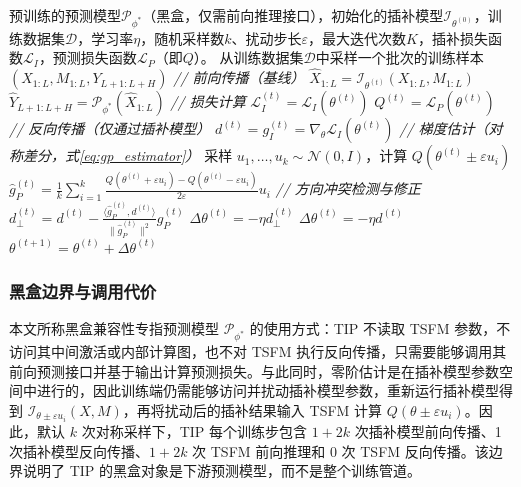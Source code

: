 \documentclass{article}
\begin{document}
\begin{algorithm}[ht]
	\caption{基于零阶梯度估计的任务感知插补方法}
	\label{alg:tip}
	\begin{algorithmic}[1]
		\Require 预训练的预测模型$\mathcal{P}_{\phi^\ast}$（黑盒，仅需前向推理接口），初始化的插补模型$\mathcal{I}_{\theta^{(0)}}$，训练数据集$\mathcal{D}$，学习率$\eta$，随机采样数$k$、扰动步长$\varepsilon$，最大迭代次数$K$，插补损失函数$\mathcal{L}_I$，预测损失函数$\mathcal{L}_P$（即$Q$）。
			\State 从训练数据集$\mathcal{D}$中采样一个批次的训练样本$(X_{1:L}, M_{1:L}, Y_{L+1:L+H})$
			\Statex\textit{// 前向传播（基线）}
			\State $\hat{X}_{1:L} =\mathcal{I}_{\theta^{(t)}}(X_{1:L}, M_{1:L})$
			\State $\hat{Y}_{L+1:L+H} =\mathcal{P}_{\phi^\ast}(\hat{X}_{1:L})$
			\Statex\textit{// 损失计算}
			\State $\mathcal{L}_I^{(t)} =\mathcal{L}_I(\theta^{(t)})$
			\State $Q^{(t)} =\mathcal{L}_P(\theta^{(t)})$
			\Statex\textit{// 反向传播（仅通过插补模型）}
			\State $d^{(t)} = g_I^{(t)} =\nabla_\theta\mathcal{L}_I(\theta^{(t)})$
			\Statex\textit{// 梯度估计（对称差分，式\ref{eq:gp_estimator}）}
			\State 采样 $u_1,\dots,u_k\sim\mathcal{N}(0,I)$，计算 $Q(\theta^{(t)}\pm\varepsilon u_i)$
			\State $\hat{g}_P^{(t)} = \frac1k\sum_{i=1}^k\frac{Q(\theta^{(t)}+\varepsilon u_i)-Q(\theta^{(t)}-\varepsilon u_i)}{2\varepsilon}u_i$
			\Statex\textit{// 方向冲突检测与修正}
				\State $d_{\perp}^{(t)} = d^{(t)} -\frac{\langle \hat{g}_P^{(t)}, d^{(t)}\rangle}{\|\hat{g}_P^{(t)}\|^2} \hat{g}_P^{(t)}$
				\State $\Delta\theta^{(t)} = -\eta d_{\perp}^{(t)}$
			\Else
				\State $\Delta\theta^{(t)} = -\eta d^{(t)}$
			\EndIf
			\State $\theta^{(t+1)} =\theta^{(t)} +\Delta\theta^{(t)}$
		\EndFor
	\end{algorithmic}
\end{algorithm}

\subsubsection{黑盒边界与调用代价}

本文所称黑盒兼容性专指预测模型 $\mathcal{P}_{\phi^\ast}$ 的使用方式：TIP 不读取 TSFM 参数，不访问其中间激活或内部计算图，也不对 TSFM 执行反向传播，只需要能够调用其前向预测接口并基于输出计算预测损失。与此同时，零阶估计是在插补模型参数空间中进行的，因此训练端仍需能够访问并扰动插补模型参数，重新运行插补模型得到 $\mathcal{I}_{\theta\pm\varepsilon u_i}(X,M)$，再将扰动后的插补结果输入 TSFM 计算 $Q(\theta\pm\varepsilon u_i)$。因此，默认 $k$ 次对称采样下，TIP 每个训练步包含 $1+2k$ 次插补模型前向传播、1 次插补模型反向传播、$1+2k$ 次 TSFM 前向推理和 0 次 TSFM 反向传播。该边界说明了 TIP 的黑盒对象是下游预测模型，而不是整个训练管道。
\end{document}
